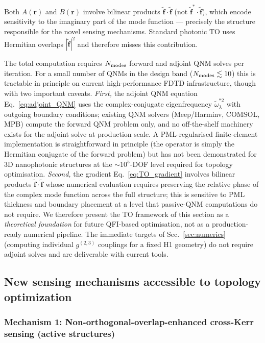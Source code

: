 \documentclass[12pt]{article}
\newcommand{\tf}{\tilde{\mathbf{f}}}
\begin{document}
Both $A(\mathbf{r})$ and $B(\mathbf{r})$ involve bilinear products
$\tf\cdot\tf$ (not $\tf^*\cdot\tf$), which encode sensitivity to the
imaginary part of the mode function --- precisely the structure
responsible for the novel sensing mechanisms.  Standard photonic TO
uses Hermitian overlaps $|\tf|^2$ and therefore misses this contribution.

The total computation requires $N_{\rm modes}$ forward and adjoint
QNM solves per iteration.  For a small number of QNMs in the design
band ($N_{\rm modes}\lesssim 10$) this is tractable in principle on
current high-performance FDTD infrastructure, though with two
important caveats.  \emph{First,} the adjoint QNM equation
Eq.~\eqref{eq:adjoint_QNM} uses the complex-conjugate eigenfrequency
$\tilde\omega_\lambda^{*2}$ with outgoing boundary conditions;
existing QNM solvers (Meep/Harminv, COMSOL, MPB) compute the forward
QNM problem only, and no off-the-shelf machinery exists for the
adjoint solve at production scale.  A PML-regularised finite-element
implementation is straightforward in principle (the operator is
simply the Hermitian conjugate of the forward problem) but has not
been demonstrated for 3D nanophotonic structures at the
$\sim\! 10^5$-DOF level required for topology optimisation.
\emph{Second,} the gradient Eq.~\eqref{eq:TO_gradient} involves
bilinear products $\tf\cdot\tf$ whose numerical evaluation requires
preserving the relative phase of the complex mode function across
the full structure; this is sensitive to PML thickness and boundary
placement at a level that passive-QNM computations do not require.
We therefore present the TO framework of this section as a
\emph{theoretical foundation} for future QFI-based optimisation, not
as a production-ready numerical pipeline.  The immediate targets of
Sec.~\ref{sec:numerics} (computing individual $g^{(2,3)}$ couplings
for a fixed H1 geometry) do not require adjoint solves and are
deliverable with current tools.

\subsection{New sensing mechanisms accessible to topology optimization}

\subsubsection*{Mechanism 1: Non-orthogonal-overlap-enhanced cross-Kerr sensing
(active structures)}
\end{document}
